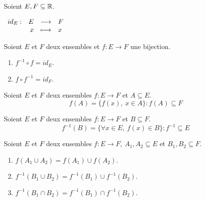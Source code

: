 \begin{definition}
    Soient $E, F \subseteq \mathbb{R}$.
	\begin{center}
		$
		\begin{array}{rrcl} id_E : & E & \longrightarrow & F \\ & x & \longmapsto & x \end{array}
		$
	\end{center}
\end{definition}

\begin{proposition}
	Soient $E$ et $F$ deux ensembles et $f : E \to F$ une bijection.
    \begin{multicols}{2}
        \begin{enumerate}
            \item $f^{-1} \circ f = id_E$.
            \item $f \circ f^{-1} = id_F$.
        \end{enumerate}
    \end{multicols}
\end{proposition}

\begin{definition}
    Soient $E$ et $F$ deux ensembles $f : E \to F$ et $A \subseteq E$.
	\[ f(A) = \{ f(x),\ x \in A \} : f(A) \subseteq F \]
\end{definition}

\begin{definition}
	Soient $E$ et $F$ deux ensembles $f : E \to F$ et $B \subseteq F$.
	\[ f^{-1}(B) = \{ \forall x \in E,\ f(x) \in B \} : f^{-1} \subseteq E \]
\end{definition}

\begin{proposition}
    Soient $E$ et $F$ deux ensembles $f : E \to F,\ A_1, A_2 \subseteq E$ et $B_1, B_2 \subseteq F$.
    \begin{enumerate}
        \item $f(A_1 \cup A_2) = f(A_1) \cup f(A_2)$.
        \item $f^{-1} (B_1 \cup B_2) = f^{-1} (B_1) \cup f^{-1} (B_2)$.
        \item $f^{-1} (B_1 \cap B_2) = f^{-1} (B_1) \cap f^{-1} (B_2)$.
    \end{enumerate}
\end{proposition} 

